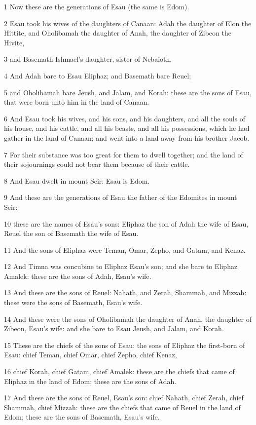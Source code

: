 \par 1 Now these are the generations of Esau (the same is Edom).
\par 2 Esau took his wives of the daughters of Canaan: Adah the daughter of Elon the Hittite, and Oholibamah the daughter of Anah, the daughter of Zibeon the Hivite,
\par 3 and Basemath Ishmael's daughter, sister of Nebaioth.
\par 4 And Adah bare to Esau Eliphaz; and Basemath bare Reuel;
\par 5 and Oholibamah bare Jeush, and Jalam, and Korah: these are the sons of Esau, that were born unto him in the land of Canaan.
\par 6 And Esau took his wives, and his sons, and his daughters, and all the souls of his house, and his cattle, and all his beasts, and all his possessions, which he had gather in the land of Canaan; and went into a land away from his brother Jacob.
\par 7 For their substance was too great for them to dwell together; and the land of their sojournings could not bear them because of their cattle.
\par 8 And Esau dwelt in mount Seir: Esau is Edom.
\par 9 And these are the generations of Esau the father of the Edomites in mount Seir:
\par 10 these are the names of Esau's sons: Eliphaz the son of Adah the wife of Esau, Reuel the son of Basemath the wife of Esau.
\par 11 And the sons of Eliphaz were Teman, Omar, Zepho, and Gatam, and Kenaz.
\par 12 And Timna was concubine to Eliphaz Esau's son; and she bare to Eliphaz Amalek: these are the sons of Adah, Esau's wife.
\par 13 And these are the sons of Reuel: Nahath, and Zerah, Shammah, and Mizzah: these were the sons of Basemath, Esau's wife.
\par 14 And these were the sons of Oholibamah the daughter of Anah, the daughter of Zibeon, Esau's wife: and she bare to Esau Jeush, and Jalam, and Korah.
\par 15 These are the chiefs of the sons of Esau: the sons of Eliphaz the first-born of Esau: chief Teman, chief Omar, chief Zepho, chief Kenaz,
\par 16 chief Korah, chief Gatam, chief Amalek: these are the chiefs that came of Eliphaz in the land of Edom; these are the sons of Adah.
\par 17 And these are the sons of Reuel, Esau's son: chief Nahath, chief Zerah, chief Shammah, chief Mizzah: these are the chiefs that came of Reuel in the land of Edom; these are the sons of Basemath, Esau's wife.
